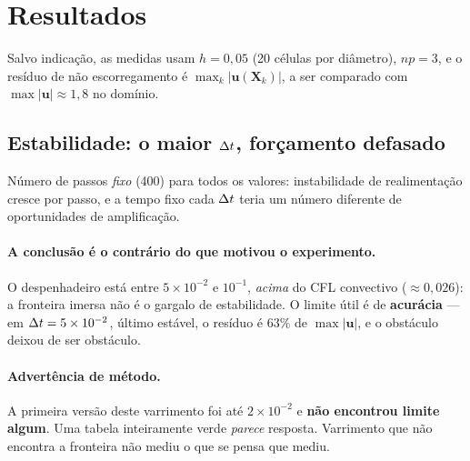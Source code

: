 \section{Resultados}
\label{sec:resultados}

Salvo indicação, as medidas usam $h = 0{,}05$ (20 células por diâmetro), $np=3$,
e o resíduo de não escorregamento é $\max_k |\mathbf{u}(\mathbf{X}_k)|$, a ser
comparado com $\max|\mathbf{u}| \approx 1{,}8$ no domínio.

\subsection{Estabilidade: o maior \texorpdfstring{$\Delta t$}{dt}, forçamento defasado}


\medskip
Número de passos \emph{fixo} (400) para todos os valores: instabilidade de
realimentação cresce por passo, e a tempo fixo cada $\Delta t$ teria um número
diferente de oportunidades de amplificação.

\paragraph{A conclusão é o contrário do que motivou o experimento.} O
despenhadeiro está entre $5\times 10^{-2}$ e $10^{-1}$, \emph{acima} do CFL
convectivo ($\approx 0{,}026$): a fronteira imersa não é o gargalo de
estabilidade. O limite útil é de \textbf{acurácia} --- em $\Delta t = 5\times10^{-2}$,
último estável, o resíduo é $63\%$ de $\max|\mathbf{u}|$, e o obstáculo deixou de
ser obstáculo.

\paragraph{Advertência de método.} A primeira versão deste varrimento foi até
$2\times10^{-2}$ e \textbf{não encontrou limite algum}. Uma tabela inteiramente
verde \emph{parece} resposta. Varrimento que não encontra a fronteira não mediu o
que se pensa que mediu.

